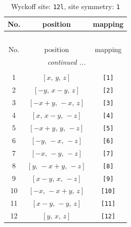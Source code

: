 \documentclass[fleqn,8pt]{jsarticle}
\begin{document}
\begin{longtable}{ccc}
\caption{Wyckoff site: {\tt 12l}, site symmetry: {\tt 1}}
 \\
 \hline \hline
No. & position & mapping \\ \hline \endfirsthead

\multicolumn{2}{l}{\tablename\ \thetable{}} \\
 \hline \hline
No. & position & mapping \\ \hline \endhead

 \hline \hline
\multicolumn{2}{r}{\footnotesize\it continued ...} \\ \endfoot

 \hline \hline
\multicolumn{2}{r}{} \\ \endlastfoot

1 & $\left[ x,\, y,\, z \right]$ & {\tt [1]} \\ \hline
2 & $\left[ - y,\, x - y,\, z \right]$ & {\tt [2]} \\ \hline
3 & $\left[ - x + y,\, - x,\, z \right]$ & {\tt [3]} \\ \hline
4 & $\left[ x,\, x - y,\, - z \right]$ & {\tt [4]} \\ \hline
5 & $\left[ - x + y,\, y,\, - z \right]$ & {\tt [5]} \\ \hline
6 & $\left[ - y,\, - x,\, - z \right]$ & {\tt [6]} \\ \hline
7 & $\left[ - x,\, - y,\, - z \right]$ & {\tt [7]} \\ \hline
8 & $\left[ y,\, - x + y,\, - z \right]$ & {\tt [8]} \\ \hline
9 & $\left[ x - y,\, x,\, - z \right]$ & {\tt [9]} \\ \hline
10 & $\left[ - x,\, - x + y,\, z \right]$ & {\tt [10]} \\ \hline
11 & $\left[ x - y,\, - y,\, z \right]$ & {\tt [11]} \\ \hline
12 & $\left[ y,\, x,\, z \right]$ & {\tt [12]} \\
\end{longtable}
\end{document}
